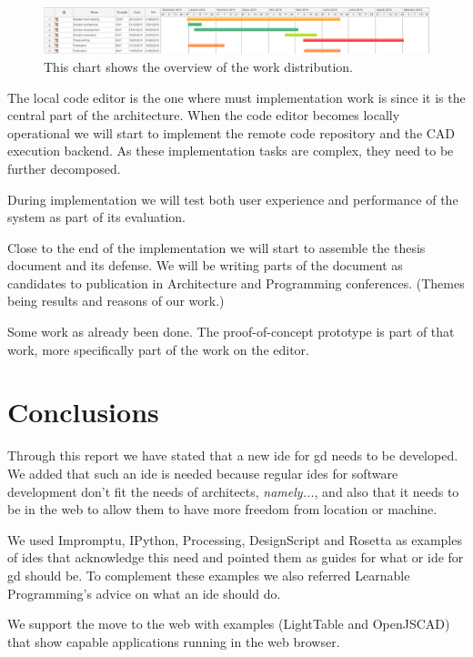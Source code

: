 \documentclass{./llncs2e/llncs}
\begin{document}
	\begin{figure}
		\centering
		\includegraphics[width=1.0\textwidth]{img/schedule}
		\caption{This chart shows the overview of the work distribution.}
		\label{fig:schedule}
	\end{figure}
	
	The local code editor is the one where must implementation work is since it is the central part of the architecture.
	When the code editor becomes locally operational we will start to implement the remote code repository and the CAD execution backend.
	As these implementation tasks are complex, they need to be further decomposed.
	
	During implementation we will test both user experience and performance of the system as part of its evaluation.
	
	Close to the end of the implementation we will start to assemble the thesis document and its defense.
	We will be writing parts of the document as candidates to publication in Architecture and Programming conferences.
	(Themes being results and reasons of our work.)
	
	Some work as already been done.
	The proof-of-concept prototype is part of that work, more specifically part of the work on the editor.
		
	

\section{Conclusions}
	Through this report we have stated that a new \ac{ide} for \ac{gd} needs to be developed.
	We added that such an \ac{ide} is needed because regular \ac{ide}s for software development don't fit the needs of architects, \emph{namely...}, and also that it needs to be in the web to allow them to have more freedom from location or machine.
	
	We used Impromptu, IPython, Processing, DesignScript and Rosetta as examples of \ac{ide}s that acknowledge this need and pointed them as guides for what or \ac{ide} for \ac{gd} should be.
	To complement these examples we also referred Learnable Programming's advice on what an \ac{ide} should do.
	
	We support the move to the web with examples (LightTable and OpenJSCAD) that show capable applications running in the web browser.
	
\end{document}
